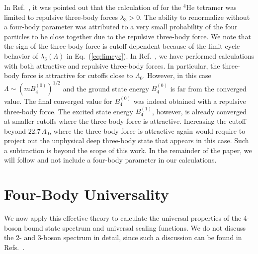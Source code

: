 \documentclass[prc,preprint,showpacs,tightenlines,%
nofootinbib]{revtex4}
\begin{document}
In Ref.~\cite{Yama06}, it was pointed out that the calculation of
\cite{Platter04} for the $^4$He tetramer
was limited to repulsive three-body forces $\lambda_3 > 0$. 
The ability to renormalize without a four-body parameter was attributed
to a very small probability of the four particles to be close together
due to the repulsive three-body force. We note that 
the sign of the three-body force is cutoff dependent because
of the limit cycle behavior of $\lambda_3(\Lambda)$ in Eq.~(\ref{eq:limcyc}).
In Ref.~\cite{Platter04}, we have performed calculations with both
attractive and repulsive three-body forces.
In particular, the three-body force is attractive for cutoffs close 
to $\Lambda_0$.
However, in this case $\Lambda \sim (mB_4^{(0)})^{1/2}$ and 
the ground state energy $B_4^{(0)}$
is far from the converged value. The final converged value for $B_4^{(0)}$ 
was indeed obtained with a repulsive three-body force. 
The excited state energy $B_4^{(1)}$, however, is already converged
at smaller cutoffs where the three-body force is attractive.
Increasing the cutoff beyond $22.7 \,\Lambda_0$, where the three-body
force is attractive again would require to project out the unphysical 
deep three-body state that appears in this case.
Such a subtraction is beyond the scope of this work.
In the remainder of the paper, we will follow \cite{Platter04} and
not include a four-body parameter in our calculations.
%
\section{Four-Body Universality}
\label{sec:res}
%
We now apply this effective theory to calculate the universal properties of 
the 4-boson bound state spectrum and universal scaling functions.
We do not discuss the 2- and 3-boson spectrum in detail, since such
a discussion can be found in 
Refs.~\cite{Braaten:2004rn,Bedaque:1998km, Platter04}.
%
\end{document}
